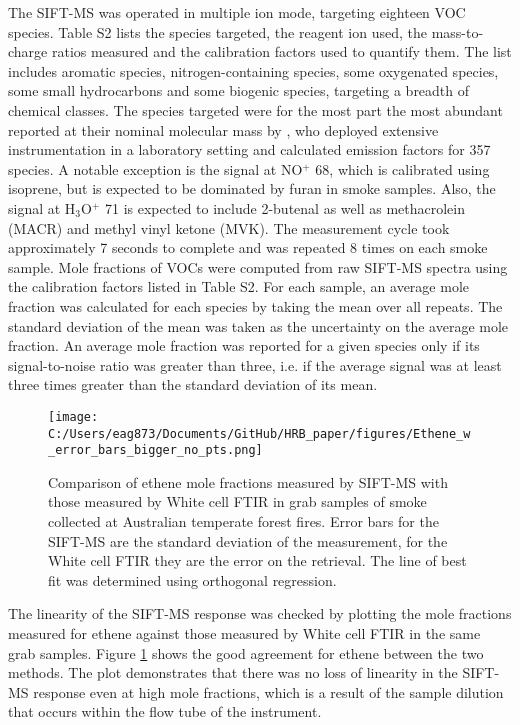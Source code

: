 \documentclass[acp, manuscript]{copernicus}
\begin{document}
The SIFT-MS was operated in multiple ion mode, targeting eighteen VOC species. Table S2 lists the species targeted, the reagent ion used, the mass-to-charge ratios measured and the calibration factors used to quantify them. The list includes aromatic species, nitrogen-containing species, some oxygenated species, some small hydrocarbons and some biogenic species, targeting a breadth of chemical classes. The species targeted were for the most part the most abundant reported at their nominal molecular mass by \citet{Yokelson2013}, who deployed extensive instrumentation in a laboratory setting and calculated emission factors for 357 species. A notable exception is the signal at NO$^+$ 68, which is calibrated using isoprene, but is expected to be dominated by furan in smoke samples. Also, the signal at H$_3$O$^+$ 71 is expected to include 2-butenal as well as methacrolein (MACR) and methyl vinyl ketone (MVK). 
The measurement cycle took approximately 7 seconds to complete and was repeated 8 times on each smoke sample. Mole fractions of VOCs were computed from raw SIFT-MS spectra using the calibration factors listed in Table S2. For each sample, an average mole fraction was calculated for each species by taking the mean over all repeats. The standard deviation of the mean was taken as the uncertainty on the average mole fraction. An average mole fraction was reported for a given species only if its signal-to-noise ratio was greater than three, i.e. if the average signal was at least three times greater than the standard deviation of its mean. 

\begin{figure}[t]
  \texttt{[image: C:/Users/eag873/Documents/GitHub/HRB\_paper/figures/Ethene\_w\_error\_bars\_bigger\_no\_pts.png]}
  \caption{Comparison of ethene mole fractions measured by SIFT-MS with those measured by White cell FTIR in grab samples of smoke collected at Australian temperate forest fires. Error bars for the SIFT-MS are the standard deviation of the measurement, for the White cell FTIR they are the error on the retrieval. The line of best fit was determined using orthogonal regression.
  }
  \label{fig:ethene}
\end{figure}

The linearity of the SIFT-MS response was checked by plotting the mole fractions measured for ethene against those measured by White cell FTIR in the same grab samples. Figure \ref{fig:ethene} shows the good agreement for ethene between the two methods. The plot demonstrates that there was no loss of linearity in the SIFT-MS response even at high mole fractions, which is a result of the sample dilution that occurs within the flow tube of the instrument.
\end{document}
